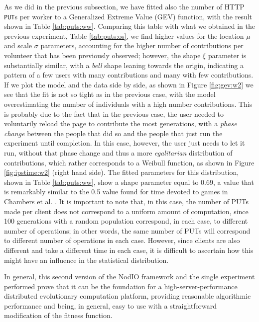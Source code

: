 \documentclass[journal,onecolumn]{IEEEtran}
\begin{document}
As we did in the previous subsection, we have fitted also the number
of HTTP {\tt PUT}s per worker to a  Generalized Extreme Value (GEV) function, with the result shown
in Table \ref{tab:puts:ww}. Comparing this table with what we obtained
in the previous experiment, Table \ref{tab:puts:os}, we find higher values
for the location $\mu$ and scale $\sigma$ parameters, accounting for
the higher number of contributions per volunteer that has been
previously observed; however, the shape $\xi$ parameter is
substantially similar, with a {\em bell} shape leaning towards the
origin, indicating a pattern of a few users with many contributions
and many with few contributions. If we plot the model and the data
side by side, as shown in Figure \ref{fig:gev:w2} we see that the fit
is not so tight as in the previous case, with the model overestimating
the number of individuals with a high number contributions. This is
probably due to the fact that in the previous case, the user needed to
voluntarily reload the page to contribute the most generations, with a
{\em phase change} between the people that did so and the people that
just run the experiment until completion. In this case, however, the
user just needs to let it run, without that phase change and thus a
more {\em egalitarian} distribution of contributions, which rather
corresponds to a Weibull function, as shown in Figure
\ref{fig:ipstime:w2} (right hand side). The fitted parameters for this
distribution, shown in Table \ref{tab:puts:ww}, show a shape parameter
equal to 0.69, a value that is remarkably similar to the 0.5 value
found for time devoted to games in Chambers et
al. \cite{chambers2005measurement}. It is important to note that, in
this case, the number of PUTs made per client does not correspond to a
uniform amount of computation, since 100 generations with a random
population correspond, in each case, to different number of
operations; in other words, the same number of PUTs will correspond to
different number of operations in each case. However, since clients
are also different and take a different time in each case, it is
difficult to ascertain how this might have an influence in the
statistical distribution.

In general, this second version of the {\sf NodIO} framework and the
single experiment performed prove that it can be the foundation for a
high-server-performance distributed evolutionary computation platform,
providing reasonable algorithmic performance and being, in general,
easy to use with a straightforward modification of the fitness
function. 
\end{document}

